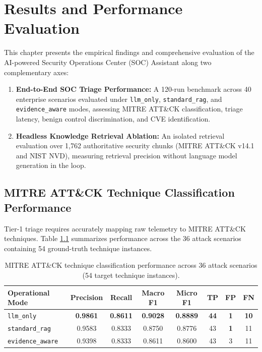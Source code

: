 \chapter{Results and Performance Evaluation}
\label{chap:results_evaluation}

This chapter presents the empirical findings and comprehensive evaluation of the AI-powered Security Operations Center (SOC) Assistant along two complementary axes:
\begin{enumerate}
    \item \textbf{End-to-End SOC Triage Performance:} A 120-run benchmark across 40 enterprise scenarios evaluated under \texttt{llm\_only}, \texttt{standard\_rag}, and \texttt{evidence\_aware} modes, assessing MITRE ATT\&CK classification, triage latency, benign control discrimination, and CVE identification.
    \item \textbf{Headless Knowledge Retrieval Ablation:} An isolated retrieval evaluation over 1,762 authoritative security chunks (MITRE ATT\&CK v14.1 and NIST NVD), measuring retrieval precision without language model generation in the loop.
\end{enumerate}

\section{MITRE ATT\&CK Technique Classification Performance}
\label{sec:mitre_classification_results}
Tier-1 triage requires accurately mapping raw telemetry to MITRE ATT\&CK techniques. Table \ref{tab:mitre_classification_metrics} summarizes performance across the 36 attack scenarios containing 54 ground-truth technique instances.

\begin{table}[!htbp]
\centering
\caption{MITRE ATT\&CK technique classification performance across 36 attack scenarios (54 target technique instances).}
\label{tab:mitre_classification_metrics}
\small
\begin{tabularx}{\textwidth}{@{}l c c c c c c c@{}}
\toprule
\textbf{Operational Mode} & \textbf{Precision} & \textbf{Recall} & \textbf{Macro F1} & \textbf{Micro F1} & \textbf{TP} & \textbf{FP} & \textbf{FN} \\
\midrule
\texttt{llm\_only}       & \textbf{0.9861} & \textbf{0.8611} & \textbf{0.9028} & \textbf{0.8889} & \textbf{44} & \textbf{1} & \textbf{10} \\
\texttt{standard\_rag}   & 0.9583          & 0.8333          & 0.8750          & 0.8776          & 43          & \textbf{1} & 11          \\
\texttt{evidence\_aware} & 0.9398          & 0.8333          & 0.8611          & 0.8600          & 43          & 3          & 11          \\
\bottomrule
\end{tabularx}
\end{table}

